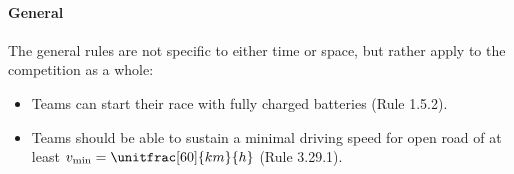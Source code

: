 \paragraph{General}
The general rules are not specific to either time or space, but rather apply to the competition as a whole:
\begin{itemize}
	\item Teams can start their race with fully charged batteries (Rule 1.5.2).
	\item Teams should be able to sustain a minimal driving speed for open road of at least $v_\mathrm{min} = \unitfrac[60]{km}{h}$ (Rule 3.29.1).
\end{itemize}

